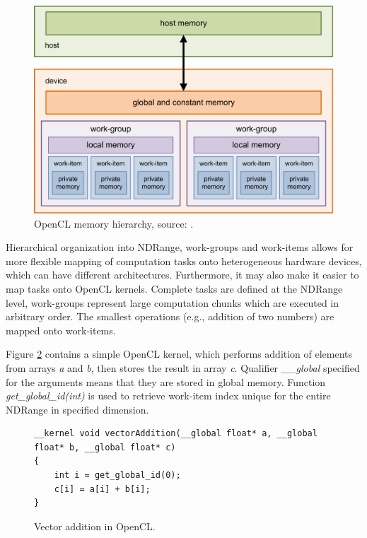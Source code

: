 \documentclass
[
    digital, %
    oneside, %
    table, %
    nolof, %
    nolot, %
    nocover %
]{fithesis3}
\begin{document}
\begin{figure}
    \begin{center}
    \includegraphics[width=125mm]{resources/opencl_hierarchy.png}
    \end{center}
    \caption{OpenCL memory hierarchy, source: \cite{opencl-hierarchy-diagram}.}
    \label{opencl-hierarchy}
\end{figure}

Hierarchical organization into NDRange, work-groups and work-items allows for more flexible mapping of computation tasks onto heterogeneous hardware
devices, which can have different architectures. Furthermore, it may also make it easier to map tasks onto OpenCL kernels. Complete tasks are defined
at the NDRange level, work-groups represent large computation chunks which are executed in arbitrary order. The smallest operations (e.g., addition of
two numbers) are mapped onto work-items.

Figure \ref{vector_addition} contains a simple OpenCL kernel, which performs addition of elements from arrays \textit{a} and \textit{b}, then stores
the result in array \textit{c}. Qualifier \textit{\_\_global} specified for the arguments means that they are stored in global memory. Function
\textit{get\_global\_id(int)} is used to retrieve work-item index unique for the entire NDRange in specified dimension.
\begin{figure}
\begin{lstlisting}
__kernel void vectorAddition(__global float* a, __global float* b, __global float* c)
{
    int i = get_global_id(0);
    c[i] = a[i] + b[i];
}
\end{lstlisting}
\caption{Vector addition in OpenCL.}
\label{vector_addition}
\end{figure}
\end{document}
